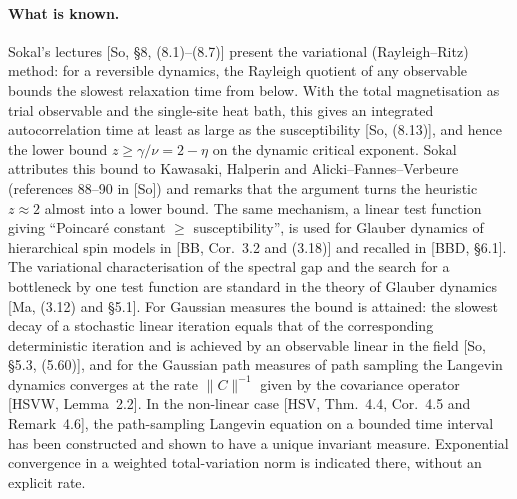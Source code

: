 \documentclass[11pt,a4paper]{article}
\theoremstyle{definition}
\theoremstyle{remark}
\begin{document}
\paragraph{What is known.}
Sokal's lectures [So, \S8, (8.1)--(8.7)] present the variational (Rayleigh--Ritz) method: for a reversible dynamics, the Rayleigh quotient of any observable bounds the slowest relaxation time from below.
With the total magnetisation as trial observable and the single-site heat bath, this gives an integrated autocorrelation time at least as large as the susceptibility [So, (8.13)], and hence the lower bound $z\ge\gamma/\nu=2-\eta$ on the dynamic critical exponent.
Sokal attributes this bound to Kawasaki, Halperin and Alicki--Fannes--Verbeure (references 88--90 in [So]) and remarks that the argument turns the heuristic $z\approx2$ almost into a lower bound.
The same mechanism, a linear test function giving ``Poincar\'e constant $\ge$ susceptibility'', is used for Glauber dynamics of hierarchical spin models in [BB, Cor.~3.2 and (3.18)] and recalled in [BBD, \S6.1].
The variational characterisation of the spectral gap and the search for a bottleneck by one test function are standard in the theory of Glauber dynamics [Ma, (3.12) and \S5.1].
For Gaussian measures the bound is attained: the slowest decay of a stochastic linear iteration equals that of the corresponding deterministic iteration and is achieved by an observable linear in the field [So, \S5.3, (5.60)], and for the Gaussian path measures of path sampling the Langevin dynamics converges at the rate $\|C\|^{-1}$ given by the covariance operator [HSVW, Lemma~2.2].
In the non-linear case [HSV, Thm.~4.4, Cor.~4.5 and Remark~4.6], the path-sampling Langevin equation on a bounded time interval has been constructed and shown to have a unique invariant measure.
Exponential convergence in a weighted total-variation norm is indicated there, without an explicit rate.
\end{document}
